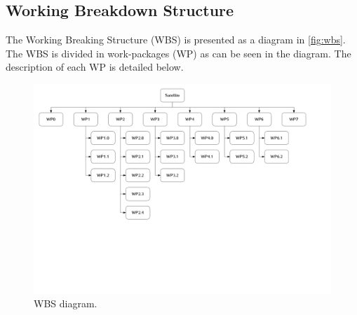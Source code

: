 \subsection{Working Breakdown Structure}

The Working Breaking Structure (WBS) is presented as a diagram in \autoref{fig:wbs}. The WBS is divided in work-packages (WP) as can be seen in the diagram. The description of each WP is detailed below.

\begin{figure}[!ht]
    \begin{center}
        \includegraphics[width=\textwidth]{figures/wbs.pdf}
        \caption{WBS diagram.}
        \label{fig:wbs}
    \end{center}
\end{figure}

